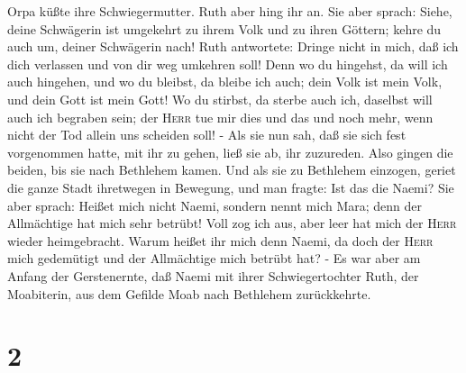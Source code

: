 Orpa küßte ihre Schwiegermutter. Ruth aber hing ihr an. 
Sie aber sprach: Siehe, deine Schwägerin ist umgekehrt zu ihrem Volk und
zu ihren Göttern; kehre du auch um, deiner Schwägerin nach!
 Ruth antwortete: Dringe nicht in mich, daß ich dich
verlassen und von dir weg umkehren soll! Denn wo du hingehst, da will
ich auch hingehen, und wo du bleibst, da bleibe ich auch; dein Volk ist
mein Volk, und dein Gott ist mein Gott!  Wo du stirbst,
da sterbe auch ich, daselbst will auch ich begraben sein; der
\textsc{Herr} tue mir dies und das und noch mehr, wenn nicht der Tod
allein uns scheiden soll! -  Als sie nun sah, daß sie
sich fest vorgenommen hatte, mit ihr zu gehen, ließ sie ab, ihr
zuzureden.  Also gingen die beiden, bis sie nach
Bethlehem kamen. Und als sie zu Bethlehem einzogen, geriet die ganze
Stadt ihretwegen in Bewegung, und man fragte: Ist das die Naemi?
 Sie aber sprach: Heißet mich nicht Naemi, sondern nennt
mich Mara; denn der Allmächtige hat mich sehr betrübt! 
Voll zog ich aus, aber leer hat mich der \textsc{Herr} wieder
heimgebracht. Warum heißet ihr mich denn Naemi, da doch der
\textsc{Herr} mich gedemütigt und der Allmächtige mich betrübt hat? -
 Es war aber am Anfang der Gerstenernte, daß Naemi mit
ihrer Schwiegertochter Ruth, der Moabiterin, aus dem Gefilde Moab nach
Bethlehem zurückkehrte.

\hypertarget{section-1}{%
\section{2}\label{section-1}}


